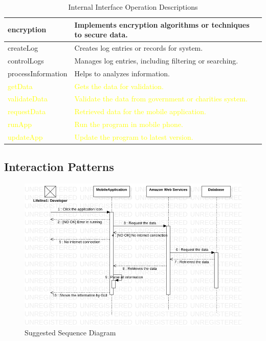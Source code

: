 \begin{center}
\begin{table}[H]
\begin{tabular}{| m{6cm}| m{8cm} |}
            \hline
            encryption & Implements encryption algorithms or techniques to secure data.\\
            \hline
            createLog & Creates log entries or records for system.\\
            \hline
            controlLogs & Manages log entries, including filtering or searching.\\
            \hline
            processInformation & Helps to analyzes information.\\
            \hline
            \textcolor{yellow}{getData} & \textcolor{yellow}{Gets the data for validation.} \\
            \hline
            \textcolor{yellow}{validateData} & \textcolor{yellow}{Validate the data from government or charities system.} \\
            \hline
            \textcolor{yellow}{requestData} & \textcolor{yellow}{Retrieved data for the mobile application.} \\
            \hline
            \textcolor{yellow}{runApp} & \textcolor{yellow}{Run the program in mobile phone.} \\
            \hline
            \textcolor{yellow}{updateApp} & \textcolor{yellow}{Update the program to latest version.} \\
            \hline
        \end{tabular}
        \caption[Internal Interface Operation Descriptions]{Internal Interface Operation Descriptions}
    \end{table}
\end{center}

\subsection{Interaction Patterns}

\begin{figure}[H]
    \includegraphics[scale = 0.4]{assets/SequenceDiagramSuggestion.png}    
    \caption[Suggested Sequence Diagram]{Suggested Sequence Diagram}
\end{figure}

